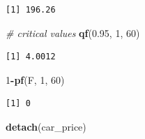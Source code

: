 \documentclass[
]{book}
\newenvironment{Shaded}{\begin{snugshade}}{\end{snugshade}}
\newcommand{\CommentTok}[1]{\textcolor[rgb]{0.56,0.35,0.01}{\textit{#1}}}
\newcommand{\DecValTok}[1]{\textcolor[rgb]{0.00,0.00,0.81}{#1}}
\newcommand{\FloatTok}[1]{\textcolor[rgb]{0.00,0.00,0.81}{#1}}
\newcommand{\KeywordTok}[1]{\textcolor[rgb]{0.13,0.29,0.53}{\textbf{#1}}}
\newcommand{\NormalTok}[1]{#1}
\newcommand{\OperatorTok}[1]{\textcolor[rgb]{0.81,0.36,0.00}{\textbf{#1}}}
\newcommand{\StringTok}[1]{\textcolor[rgb]{0.31,0.60,0.02}{#1}}
\begin{document}
\begin{Shaded}
\end{Shaded}

\begin{verbatim}
[1] 196.26
\end{verbatim}

\begin{Shaded}
\begin{Highlighting}[]
\CommentTok{# critical values}
\KeywordTok{qf}\NormalTok{(}\FloatTok{0.95}\NormalTok{, }\DecValTok{1}\NormalTok{, }\DecValTok{60}\NormalTok{)}
\end{Highlighting}
\end{Shaded}

\begin{verbatim}
[1] 4.0012
\end{verbatim}

\begin{Shaded}
\begin{Highlighting}[]
\DecValTok{1}\OperatorTok{-}\KeywordTok{pf}\NormalTok{(F, }\DecValTok{1}\NormalTok{, }\DecValTok{60}\NormalTok{)}
\end{Highlighting}
\end{Shaded}

\begin{verbatim}
[1] 0
\end{verbatim}

\begin{Shaded}
\begin{Highlighting}[]
\KeywordTok{detach}\NormalTok{(car_price)}
\end{Highlighting}
\end{Shaded}
\end{document}
